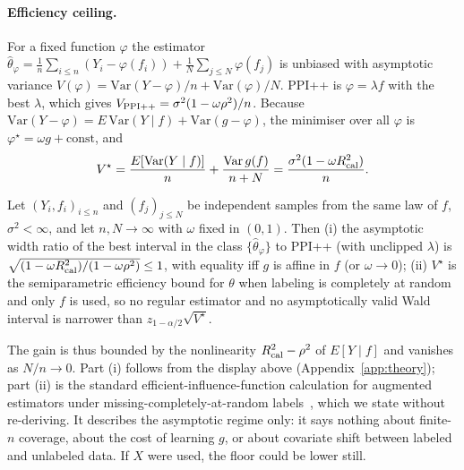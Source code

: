 \paragraph{Efficiency ceiling.} For a fixed function $\varphi$ the estimator $\hat\theta_\varphi=\frac1n\sum_{i\le n}(Y_i-\varphi(f_i))+\frac1N\sum_{j\le N}\varphi(f_j)$ is unbiased with asymptotic variance $V(\varphi)=\mathrm{Var}(Y-\varphi)/n+\mathrm{Var}(\varphi)/N$. PPI++ is $\varphi=\lambda f$ with the best $\lambda$, which gives $V_{\rm PPI++}=\sigma^2(1-\omega\rho^2)/n$. Because $\mathrm{Var}(Y-\varphi)=E\,\mathrm{Var}(Y\mid f)+\mathrm{Var}(g-\varphi)$, the minimiser over all $\varphi$ is $\varphi^\star=\omega g+\mathrm{const}$, and
\begin{equation}
V^\star=\frac{E[\mathrm{Var}(Y\mid f)]}{n}+\frac{\mathrm{Var}\,g(f)}{n+N}=\frac{\sigma^2(1-\omega R^2_{\rm cal})}{n}.
\label{eq:floor}
\end{equation}
\begin{proposition}\label{prop:floor}
Let $(Y_i,f_i)_{i\le n}$ and $(f_j)_{j\le N}$ be independent samples from the same law of $f$, $\sigma^2<\infty$, and let $n,N\to\infty$ with $\omega$ fixed in $(0,1)$. Then (i) the asymptotic width ratio of the best interval in the class $\{\hat\theta_\varphi\}$ to PPI++ (with unclipped $\lambda$) is $\sqrt{(1-\omega R^2_{\rm cal})/(1-\omega\rho^2)}\le1$, with equality iff $g$ is affine in $f$ (or $\omega\to0$); (ii) $V^\star$ is the semiparametric efficiency bound for $\theta$ when labeling is completely at random and only $f$ is used, so no regular estimator and no asymptotically valid Wald interval is narrower than $z_{1-\alpha/2}\sqrt{V^\star}$.
\end{proposition}
The gain is thus bounded by the nonlinearity $R^2_{\rm cal}-\rho^2$ of $E[Y\mid f]$ and vanishes as $N/n\to0$. Part (i) follows from the display above (Appendix~\ref{app:theory}); part (ii) is the standard efficient-influence-function calculation for augmented estimators under missing-completely-at-random labels~\citep{robins1994aipw,tsiatis2006}, which we state without re-deriving. It describes the asymptotic regime only: it says nothing about finite-$n$ coverage, about the cost of learning $g$, or about covariate shift between labeled and unlabeled data. If $X$ were used, the floor could be lower still.

